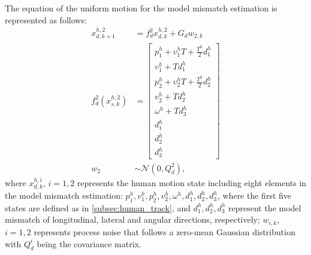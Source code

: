\documentclass[journal]{IEEEtran}
\begin{document}
	The equation of the uniform motion for the model mismatch estimation is represented as follows:
	\begin{subequations}
		\begin{align*}
			x_{d,k+1}^{h,2}&= f_d^2x_{d,k}^{h,2}+G_dw_{2,k} \label{eqn:h_d_dyn}\\
            f_d^2(x_{s,k}^{h,2})&=\left[
			\begin{array}{c}
				p^h_1+v^h_1T+\frac{T^2}{2}d^h_1\\
				v^h_1+Td^h_1\\
				p^h_2+v^h_2T+\frac{T^2}{2}d^h_2\\
				v^h_2+Td^h_2\\
				\omega^h+Td^h_3\\ 
                d^h_1\\
                d^h_2\\
                d^h_3
			\end{array}\right] \\             
			w_2&\sim\mathcal{N}(0,Q^2_d),
		\end{align*}
	\end{subequations}\normalsize
	where $x_{d,k}^{h,i}$, $i=1,2$ represents the human motion state including eight elements in the model mismatch estimation: $p^h_1,v^h_1,p^h_2,v^h_2,\omega^h,d^h_1,d^h_2,d^h_3$, where 
the first five states are defined as in \cref{subsec:human_track}, and $d^h_1,d^h_2,d^h_3$ represent the model mismatch of longitudinal, lateral and angular directions, respectively; $w_{i,k}$, $i=1,2$ represents process noise that follows a zero-mean Gaussian distribution with $Q^i_d$ being the covariance matrix.
    
\end{document}
